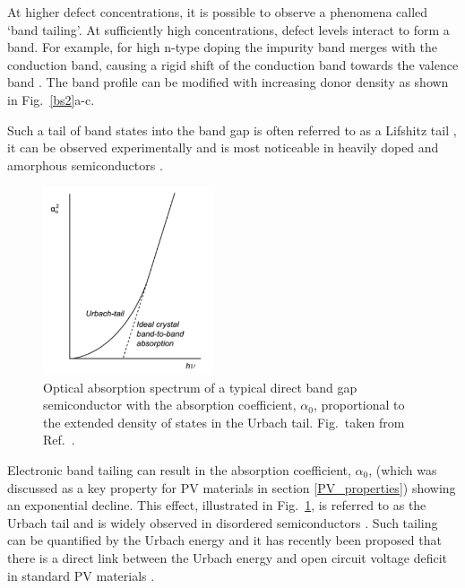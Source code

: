 \documentclass[11pt, twoside]{report}
\begin{document}
At higher defect concentrations, it is possible to observe a phenomena called `band tailing'. At sufficiently high concentrations, defect levels interact to form a band. For example, for high n-type doping the impurity band merges with the conduction band, causing a rigid shift of the conduction band towards the valence band \cite{Pankove}. The band profile can be modified with increasing donor density as shown in Fig.~\ref{bs2}a-c. 

Such a tail of band states into the band gap is often referred to as a Lifshitz tail \cite{Lifshitz1964}, it can be observed experimentally and is most noticeable in heavily doped and amorphous semiconductors \cite{thin_film_Boer}. 
\begin{figure}[h!]
  \centering
    \includegraphics[width=0.45\textwidth]{figures/urbach_fig.png}
    \caption[Optical absorption spectrum of a typical direct band gap semiconductor with the absorption coefficient, $\alpha_{0}$, proportional to the extended density of states in the Urbach tail.]{Optical absorption spectrum of a typical direct band gap semiconductor with the absorption coefficient, $\alpha_{0}$, proportional to the extended density of states in the Urbach tail. Fig.~taken from Ref.~.}
  \label{urbach_fig}
\end{figure}
Electronic band tailing can result in the absorption coefficient, $\alpha_{0}$, (which was discussed as a key property for PV materials in section \ref{PV_properties}) showing an exponential decline. This effect, illustrated in Fig.~\ref{urbach_fig}, is referred to as the Urbach tail \cite{Urbach1953} and is widely observed in disordered semiconductors \cite{thin_film_Boer}. Such tailing can be quantified by the Urbach energy and it has recently been proposed that there is a direct link between the Urbach energy and open circuit voltage deficit in standard PV materials \cite{culprit, UrbachE_Voc}.
\end{document}
